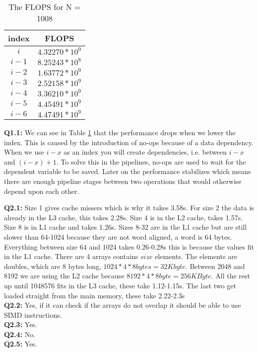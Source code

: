 \documentclass[10pt]{report}
\begin{document}
\begin{wraptable}{r}{6cm}
    \centering
    \begin{tabular}{c|c}
        index&FLOPS\\
        \hline
	      $i$&$4.32270 * 10^{9}$\\
	    $i-1$&$8.25243 * 10^{8}$\\
	    $i-2$&$1.63772 * 10^{9}$\\
	    $i-3$&$2.52158 * 10^{9}$\\
	    $i-4$&$3.36210 * 10^{9}$\\
	    $i-5$&$4.45491 * 10^{9}$\\
	    $i-6$&$4.47491 * 10^{9}$\\
    \end{tabular}
    \caption{The FLOPS for N = 1008}
    \label{1008}
\end{wraptable}
\textbf{Q1.1:} We can see in Table \ref{1008} that the performance drops when we lower the index. This is caused by the introduction of no-ops because of a data dependency. When we use $i - x$ as an index you will create dependencies, i.e. between $i - x$ and $(i - x) + 1$. To solve this in the pipelines, no-ops are used to wait for the dependent variable to be saved. Later on the performance stabilizes which means there are enough pipeline stages between two operations that would otherwise depend upon each other.\par
\textbf{Q2.1:} Size 1 gives cache missers which is why it takes 3.58s. For size 2 the data is already in the L3 cache, this takes 2.28s. Size 4 is in the L2 cache, takes 1.57s. Size 8 is in L1 cache and takes 1.26s. Sizes 8-32 are in the L1 cache but are still slower than 64-1024 because they are not word aligned, a word is 64 bytes. Everything between size 64 and 1024 takes 0.26-0.28s this is because the values fit in the L1 cache. There are 4 arrays contains $size$ elements. The elements are doubles, which are 8 bytes long, $1024*4*8 bytes = 32 Kbyte$. Between 2048 and 8192 we are using the L2 cache because $8192*4*8 byte = 256 KByte$. All the rest up until 1048576 fits in the L3 cache, these take 1.12-1.15s. The last two get loaded straight from the main memory, these take 2.22-2.3s\\
\textbf{Q2.2:} Yes, if it can check if the arrays do not overlap it should be able to use SIMD instructions.\\
\textbf{Q2.3:} Yes.\\
\textbf{Q2.4:} No.\\
\textbf{Q2.5:} Yes.\\
\end{document}
